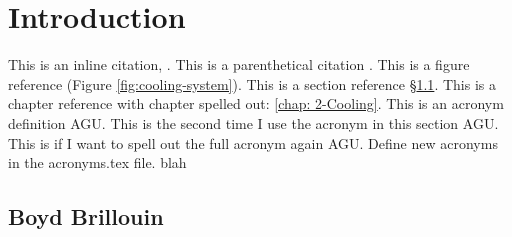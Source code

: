 \chapter{Introduction}
\label{chap:intro}
\acresetall

This is an inline citation, \cite{boyd2020nonlinear}. This is a parenthetical citation \citep{boyd2020nonlinear}. This is a figure reference (Figure \ref{fig:cooling-system}). This is a section reference \S\ref{sec:intro:section_1}. This is a chapter reference with chapter spelled out: \autoref{chap: 2-Cooling}. This is an acronym definition \ac{AGU}. This is the second time I use the acronym in this section \ac{AGU}. This is if I want to spell out the full acronym again \acf{AGU}. Define new acronyms in the acronyms.tex file. blah


\section{Boyd Brillouin}
\label{sec:intro:section_1}
\lipsum[1]

